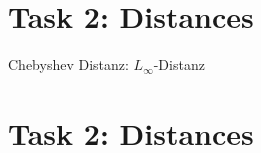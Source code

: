 \documentclass[a4paper,12pt]{article}
\begin{document}
\section{Task 2: Distances}
Chebyshev Distanz: $L_\infty$-Distanz

\section{Task 2: Distances}
\end{document}
